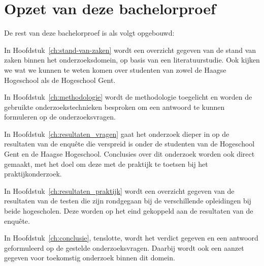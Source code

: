 \section{Opzet van deze bachelorproef}
\label{sec:opzet-bachelorproef}

De rest van deze bachelorproef is als volgt opgebouwd:

In Hoofdstuk~\ref{ch:stand-van-zaken} wordt een overzicht gegeven van de stand van zaken binnen het onderzoeksdomein, op basis van een literatuurstudie. Ook kijken we wat we kunnen te weten komen over studenten van zowel de Haagse Hogeschool als de Hogeschool Gent.

In Hoofdstuk~\ref{ch:methodologie} wordt de methodologie toegelicht en worden de gebruikte onderzoekstechnieken besproken om een antwoord te kunnen formuleren op de onderzoeksvragen.

In Hoofdstuk~\ref{ch:resultaten_vragen} gaat het onderzoek dieper in op de resultaten van de enquête die verspreid is onder de studenten van de Hogeschool Gent en de Haagse Hogeschool. Conclusies over dit onderzoek worden ook direct gemaakt, met het doel om deze met de praktijk te toetsen bij het praktijkonderzoek.

In Hoofdstuk~\ref{ch:resultaten_praktijk} wordt een overzicht gegeven van de resultaten van de testen die zijn rondgegaan bij de verschillende opleidingen bij beide hogescholen. Deze worden op het eind gekoppeld aan de resultaten van de enquête. 

In Hoofdstuk~\ref{ch:conclusie}, tenslotte, wordt het verdict gegeven en een antwoord geformuleerd op de gestelde onderzoeksvragen. Daarbij wordt ook een aanzet gegeven voor toekomstig onderzoek binnen dit domein.

